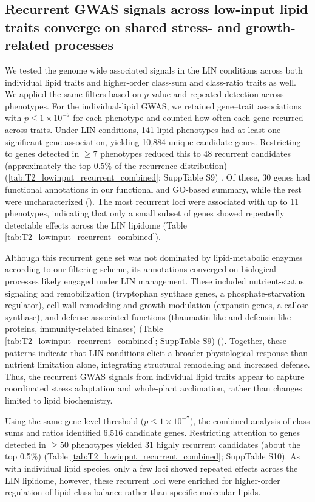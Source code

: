 \documentclass[9pt,twocolumn,twoside]{rilabRxiv}
\begin{document}
\subsection*{Recurrent GWAS signals across low-input lipid traits converge on shared stress- and growth-related processes}

We tested the genome wide associated signals in the LIN conditions across both individual lipid traits and higher-order class-sum and class-ratio traits as well. We applied the same filters based on $p$-value and repeated detection across phenotypes. For the individual-lipid GWAS, we retained gene–trait associations with $p \le 1\times10^{-7}$ for each phenotype and counted how often each gene recurred across traits. Under LIN conditions, 141 lipid phenotypes had at least one significant gene association, yielding 10,884 unique candidate genes. Restricting to genes detected in $\geq 7$ phenotypes reduced this to 48 recurrent candidates (approximately the top 0.5\% of the recurrence distribution) (\ref{tab:T2_lowinput_recurrent_combined}; SuppTable S9) . Of these, 30 genes had functional annotations in our functional and GO-based summary, while the rest were uncharacterized (\cite{GeneOntologyConsortium2026}). The most recurrent loci were associated with up to 11 phenotypes, indicating that only a small subset of genes showed repeatedly detectable effects across the LIN lipidome (Table \ref{tab:T2_lowinput_recurrent_combined}).

Although this recurrent gene set was not dominated by lipid-metabolic enzymes according to our filtering scheme, its annotations converged on biological processes likely engaged under LIN management. These included nutrient-status signaling and remobilization (tryptophan synthase genes, a phosphate-starvation regulator), cell-wall remodeling and growth modulation (expansin genes, a callose synthase), and defense-associated functions (thaumatin-like and defensin-like proteins, immunity-related kinases) (Table \ref{tab:T2_lowinput_recurrent_combined}; SuppTable S9) (\cite{GeneOntologyConsortium2026}). Together, these patterns indicate that LIN conditions elicit a broader physiological response than nutrient limitation alone, integrating structural remodeling and increased defense. Thus, the recurrent GWAS signals from individual lipid traits appear to capture coordinated stress adaptation and whole-plant acclimation, rather than changes limited to lipid biochemistry.

Using the same gene-level threshold ($p \le 1\times10^{-7}$), the combined analysis of class sums and ratios identified 6,516 candidate genes. Restricting attention to genes detected in $\geq 50$ phenotypes yielded 31 highly recurrent candidates (about the top 0.5\%) (Table \ref{tab:T2_lowinput_recurrent_combined}; SuppTable S10). As with individual lipid species, only a few loci showed repeated effects across the LIN lipidome, however, these recurrent loci were enriched for higher-order regulation of lipid-class balance rather than specific molecular lipids.
\end{document}
